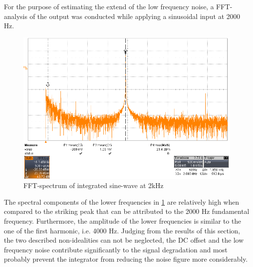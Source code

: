 For the purpose of estimating the extend of the low frequency noise, a FFT-analysis of the output was conducted while applying a sinusoidal input at 2000 Hz.

\begin{figure}[htbp]
 \centering
 \centerline{\includegraphics[scale=0.3]{figures/Results/Noisespectrum/sin2k-0_02v}}

  \caption[Kurze Abbildungsbeschreibung]{FFT-spectrum of integrated sine-wave at 2kHz}
\label{fig.noisefft}
\end{figure}

The spectral components of the lower frequencies in \ref{fig.noisefft} are relatively high when compared to the striking peak that can be attributed to the 2000 Hz fundamental frequency.
Furthermore, the amplitude of the lower frequencies is similar to the one of the first harmonic, i.e. 4000 Hz.
Judging from the results of this section, the two described non-idealities can not be neglected, the DC offset and the low frequency noise contribute significantly to the signal degradation and
most probably prevent the integrator from reducing the noise figure more considerably.



